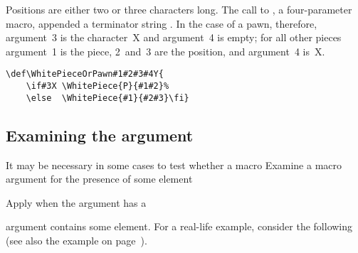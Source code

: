 \documentclass[letterpaper]{book}
\begin{document}
Positions  are either two or three characters long.
The call to , a four-parameter macro,
appended a terminator string . 
In the case of a pawn, therefore, argument~3 is the character~\n X
and argument~4 is empty; for all other pieces argument~1
is the piece, 2~and~3 are the position, and argument~4 is~\n X.
\begin{verbatim}
\def\WhitePieceOrPawn#1#2#3#4Y{
    \if#3X \WhitePiece{P}{#1#2}%
    \else  \WhitePiece{#1}{#2#3}\fi}
\end{verbatim}

\subsection{Examining the argument}

It may be necessary in some cases to test whether a macro
\howto Examine a macro argument for the presence of some element\par
\howto Apply  when the argument has a \par
argument contains some element. For a real-life example,
consider the following (see also the 
\alt
example on page~\pageref{left:display}).
\end{document}
